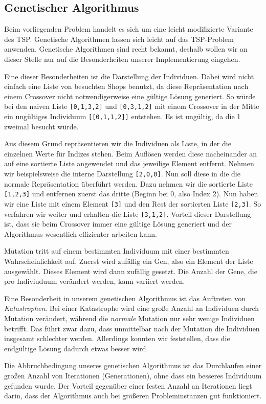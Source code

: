 \subsection{Genetischer Algorithmus}

Beim vorliegenden Problem handelt es sich um eine leicht modifizierte Variante des TSP. Genetische Algorithmen lassen sich leicht auf das TSP-Problem anwenden. Genetische Algorithmen sind recht bekannt, deshalb wollen wir an dieser Stelle nur auf die Besonderheiten unserer Implementierung eingehen.

Eine dieser Besonderheiten ist die Darstellung der Individuen. Dabei wird nicht einfach eine Liste von besuchten Shops benutzt, da diese Repräsentation nach einem Crossover nicht notwendigerweise eine gültige Lösung generiert. So würde bei den naiven Liste \texttt{[0,1,3,2]} und \texttt{[0,3,1,2]} mit einem Crossover in der Mitte ein ungültiges Individuum \texttt{[[0,1,1,2]]} entstehen. Es ist ungültig, da die 1 zweimal besucht würde. 

Aus diesem Grund repräsentieren wir die Individuen als Liste, in der die einzelnen Werte für Indizes stehen. Beim Auflösen werden diese nacheinander an auf eine sortierte Liste angewendet und das jeweilige Element entfernt. Nehmen wir beispielsweise die interne Darstellung \texttt{[2,0,0]}. Nun soll diese in die die normale Repräsentation überführt werden. Dazu nehmen wir die sortierte Liste \texttt{[1,2,3]} und entfernen zuerst das dritte (Beginn bei 0, also Index 2). Nun haben wir eine Liste mit einem Element \texttt{[3]} und den Rest der sortierten Liste \texttt{[2,3]}. So verfahren wir weiter und erhalten die Liste \texttt{[3,1,2]}. Vorteil dieser Darstellung ist, dass sie beim Crossover immer eine gültige Lösung generiert und der Algorithmus wesentlich effizienter arbeiten kann.

Mutation tritt auf einem bestimmten Individuum mit einer bestimmten Wahrscheinlichkeit auf. Zuerst wird zufällig ein Gen, also ein Element der Liste ausgewählt. Dieses Element wird dann zufällig gesetzt. Die Anzahl der Gene, die pro Indiviuduum verändert werden, kann variiert werden. 

Eine Besonderheit in unserem genetischen Algorithmus ist das Auftreten von \emph{Katastrophen}. Bei einer Katastrophe wird eine große Anzahl an Individuen durch Mutation verändert, während die \emph{normale} Mutation nur sehr wenige Individuen betrifft. Das führt zwar dazu, dass unmittelbar nach der Mutation die Individuen insgesamt schlechter werden. Allerdings konnten wir feststellen, dass die endgültige Lösung dadurch etwas besser wird. 

Die Abbruchbedingung unseres genetischen Algorithmus ist das Durchlaufen einer großen Anzahl von Iterationen (Generationen), ohne dass ein besseres Individuum gefunden wurde. Der Vorteil gegenüber einer festen Anzahl an Iterationen liegt darin, dass der Algorithmus auch bei größeren Probleminstanzen gut funktioniert.

